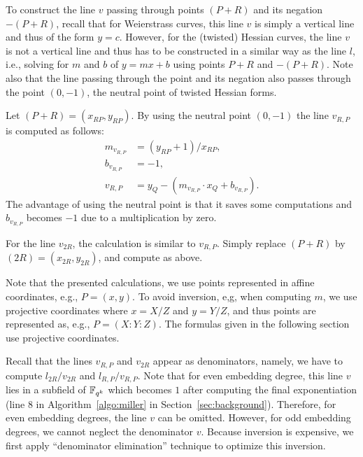 To construct the line $v$ passing through points $(P+R)$ and its negation $-(P+R)$,
recall that for Weierstrass curves,
this line $v$ is simply a vertical line
and thus of the form $y = c$.
However, for the (twisted) Hessian curves, the line $v$ is not a vertical line
and thus has to be constructed in a similar way as the line $l$,
i.e., solving for $m$ and $b$ of $y = mx + b$ using points $P+R$ and $-(P+R)$.
Note also that the line passing through the point and its negation also passes through
the point $(0,-1)$, the neutral point of twisted Hessian forms.

Let $(P+R) = (x_{RP},y_{RP})$.
By using the neutral point $(0,-1)$
the line $v_{R,P}$ is computed as follows:
\begin{align*}
m_{v_{R,P}} &= (y_{RP} + 1) / x_{RP},	\\
b_{v_{R,P}} &= -1,			\\
v_{R,P} &= y_Q - (m_{v_{R,P}} \cdot x_Q + b_{v_{R,P}}).
\end{align*}
The advantage of using the neutral point is that
it saves some computations and $b_{v_{R,P}}$ becomes $-1$
due to a multiplication by zero.

For the line $v_{2R}$,
the calculation is similar to $v_{R,P}$.
Simply replace $(P+R)$ by $(2R) = (x_{2R}, y_{2R})$,
and compute as above.

Note that the presented calculations,
we use points represented in affine coordinates,
e.g., $P = (x,y)$.
To avoid inversion, e,g, when computing $m$,
we use projective coordinates where
$x = X/Z$ and $y = Y/Z$,
and thus points are represented as, e.g., $P = (X : Y : Z)$.
The formulas given in the following section use projective coordinates.

Recall that the lines $v_{R,P}$ and $v_{2R}$ appear as denominators,
namely, we have to compute $l_{2R}/v_{2R}$ and $l_{R,P}/v_{R,P}$.
Note that for even embedding degree,
this line $v$ lies in a subfield of $\mathbb{F}_{q^k}$
which becomes $1$ after computing the final exponentiation
({line 8} in Algorithm~\ref{algo:miller} in Section~\ref{sec:background}).
Therefore, for even embedding degrees, the line $v$ can be omitted.
However, for odd embedding degrees, we cannot neglect the denominator $v$.
Because inversion is expensive,
we first apply ``denominator elimination'' technique to optimize this inversion.


